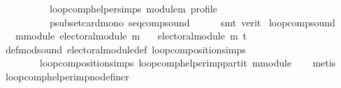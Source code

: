 \begin{isabellebody}
\ \ \ \ \ \ \ \ \ \ loop{\isacharunderscore}{\kern0pt}comp{\isacharunderscore}{\kern0pt}helper{\isachardot}{\kern0pt}simps{\isacharparenleft}{\kern0pt}{}{\isacharparenright}{\kern0pt}\ module{\isacharunderscore}{\kern0pt}m\ profile\isanewline
\ \ \ \ \ \ \ \ \ \ psubset{\isacharunderscore}{\kern0pt}card{\isacharunderscore}{\kern0pt}mono\ seq{\isacharunderscore}{\kern0pt}comp{\isacharunderscore}{\kern0pt}sound\isanewline
\ \ \ \ \isamarkupfalse%
\ {\isacharparenleft}{\kern0pt}smt\ {\isacharparenleft}{\kern0pt}verit{\isacharparenright}{\kern0pt}{\isacharparenright}{\kern0pt}\isanewline
{}\isamarkupfalse%
%
\endisatagproof
{\isafoldproof}%
%
\isadelimproof
%
\endisadelimproof
%
\isadelimdocument
%
\endisadelimdocument
%
\isatagdocument
%
\isamarkuptrue%
%
\endisatagdocument
{\isafolddocument}%
%
\isadelimdocument
%
\endisadelimdocument
{}\isamarkupfalse%
\ loop{\isacharunderscore}{\kern0pt}comp{\isacharunderscore}{\kern0pt}sound{\isacharcolon}{\kern0pt}\isanewline
\ \ \ m{\isacharunderscore}{\kern0pt}module{\isacharcolon}{\kern0pt}\ {\isachardoublequoteopen}electoral{\isacharunderscore}{\kern0pt}module\ m{\isachardoublequoteclose}\isanewline
\ \ \ {\isachardoublequoteopen}electoral{\isacharunderscore}{\kern0pt}module\ {\isacharparenleft}{\kern0pt}m\ {\isasymcirclearrowleft}\isactrlsub t{\isacharparenright}{\kern0pt}{\isachardoublequoteclose}\isanewline
%
\isadelimproof
\ \ %
\endisadelimproof
%
\isatagproof
{}\isamarkupfalse%
\ def{\isacharunderscore}{\kern0pt}mod{\isacharunderscore}{\kern0pt}sound\ electoral{\isacharunderscore}{\kern0pt}module{\isacharunderscore}{\kern0pt}def\ loop{\isacharunderscore}{\kern0pt}composition{\isachardot}{\kern0pt}simps{\isacharparenleft}{\kern0pt}{}{\isacharparenright}{\kern0pt}\isanewline
\ \ \ \ \ \ \ \ loop{\isacharunderscore}{\kern0pt}composition{\isachardot}{\kern0pt}simps{\isacharparenleft}{\kern0pt}{}{\isacharparenright}{\kern0pt}\ loop{\isacharunderscore}{\kern0pt}comp{\isacharunderscore}{\kern0pt}helper{\isacharunderscore}{\kern0pt}imp{\isacharunderscore}{\kern0pt}partit\ m{\isacharunderscore}{\kern0pt}module\isanewline
\ \ \isamarkupfalse%
\ metis%
\endisatagproof
{\isafoldproof}%
%
\isadelimproof
\isanewline
%
\endisadelimproof
\isanewline
{}\isamarkupfalse%
\ loop{\isacharunderscore}{\kern0pt}comp{\isacharunderscore}{\kern0pt}helper{\isacharunderscore}{\kern0pt}imp{\isacharunderscore}{\kern0pt}no{\isacharunderscore}{\kern0pt}def{\isacharunderscore}{\kern0pt}incr{\isacharcolon}{\kern0pt}\isanewline

\end{isabellebody}
